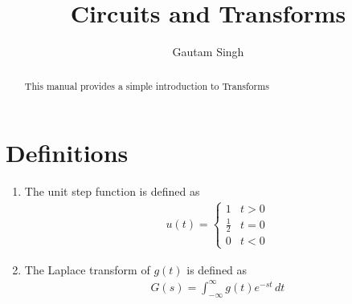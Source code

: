 \documentclass[journal,12pt,twocolumn]{IEEEtran}
\renewcommand\thesection{\arabic{section}}
\begin{document}
\let\StandardTheFigure\thefigure
\renewcommand{\thefigure}{\theproblem}
\renewcommand{\thefigure}{\arabic{section}.\arabic{figure}}
\makeatletter
{}
\makeatother


\def\putbox#1#2#3{\makebox[0in][l]{\makebox[#1][l]{}\raisebox{\baselineskip}[0in][0in]{\raisebox{#2}[0in][0in]{#3}}}}
     \def\rightbox#1{\makebox[0in][r]{#1}}
     \def\centbox#1{\makebox[0in]{#1}}
     \def\topbox#1{\raisebox{-\baselineskip}[0in][0in]{#1}}
     \def\midbox#1{\raisebox{-0.5\baselineskip}[0in][0in]{#1}}

\vspace{3cm}

\title{ 
Circuits and Transforms
}

\author{Gautam Singh}

\maketitle


\tableofcontents


\renewcommand{\thefigure}{\theenumi}
\renewcommand{\thetable}{\theenumi}



\bigskip

\begin{abstract}
This manual provides a simple introduction to Transforms
\end{abstract}
\fi

\section{Definitions}
\begin{enumerate}[label=\arabic*.,ref=\thesection.\theenumi]
\item The unit step function is defined as
\begin{align}
u(t) =
\begin{cases}
1 & t > 0
\\
	\frac{1}{2} & t = 0
\\
0 & t < 0
\end{cases}
\end{align}
\item The Laplace transform of $g(t)$ is defined as 
\begin{align}
	G(s) = \int_{-\infty}^{\infty} g(t) e^{-st}\, dt
\end{align}
 \end{enumerate}
\end{document}

